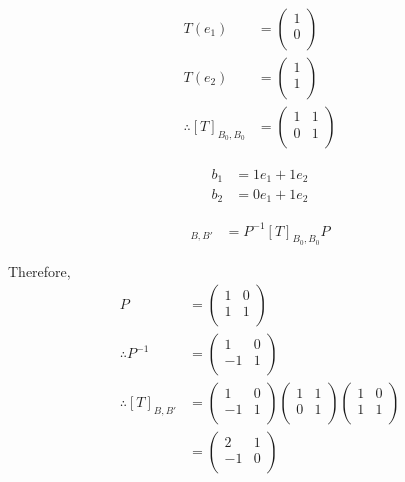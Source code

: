 \documentclass[fleqn, a4paper]{amsart}
\theoremstyle{definition}
\theoremstyle{theorem}
\theoremstyle{remark}
\numberwithin{corollary}{theorem}
\numberwithin{equation}{theorem}
\begin{document}
\begin{multicols}{1}
\subsubsection{}

\begin{align*}
	T(e_1) &= 
		\begin{pmatrix}
			1\\
			0\\
		\end{pmatrix}\\
	T(e_2) &= 
		\begin{pmatrix}
			1\\
			1\\
		\end{pmatrix}\\
	\therefore [T]_{B_0, B_0} &= 
		\begin{pmatrix}
			1 & 1\\
			0 & 1\\
		\end{pmatrix}
\end{align*}

\begin{align*}
	b_1 &= 1 e_1 + 1 e_2\\
	b_2 &= 0 e_1 + 1 e_2
\end{align*}

\begin{align*}
	[T]_{B, B'} &= P^{-1} [T]_{B_0, B_0} P
\end{align*}

Therefore,
\begin{align*}
	P &=
		\begin{pmatrix}
			1 & 0\\
			1 & 1\\
		\end{pmatrix}\\
	\therefore P^{-1} &= 
		\begin{pmatrix}
			1 & 0\\
			-1 & 1\\
		\end{pmatrix}\\
	\therefore [T]_{B, B'} &= 
		\begin{pmatrix}
		1 & 0\\
		-1 & 1\\
		\end{pmatrix}
		\begin{pmatrix}
			1 & 1\\
			0 & 1\\
		\end{pmatrix}
		\begin{pmatrix}
			1 & 0\\
			1 & 1\\
		\end{pmatrix}\\
	&= 
		\begin{pmatrix}
			2 & 1\\
			-1 & 0\\
		\end{pmatrix}
\end{align*}


\end{multicols}
\end{document}
